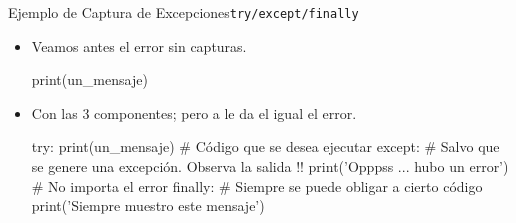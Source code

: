 \documentclass[10pt, envcountsect , spanish]{beamer}
\begin{document}
\begin{frame}[fragile]{Ejemplo de Captura de Excepciones}{\tt try/except/finally}

\unEjemplo 

\footnotesize

\begin{itemize}
\item Veamos antes el error sin capturas.
\begin{pyconsole}[][frame=single, fontsize=\scriptsize]
print(un_mensaje) 

\end{pyconsole}

\item Con las 3 componentes; pero a  le da el igual el error.

\begin{pyconsole}[][frame=single, fontsize=\scriptsize]
try:
    print(un_mensaje)  # Código que se desea ejecutar
except:                # Salvo que se genere una excepción. Observa la salida !!
    print('Opppss ... hubo un error')   # No importa el error
finally:               # Siempre se puede obligar a cierto código
    print('Siempre muestro este mensaje')

\end{pyconsole}

\end{itemize}
\end{frame}
\end{document}
